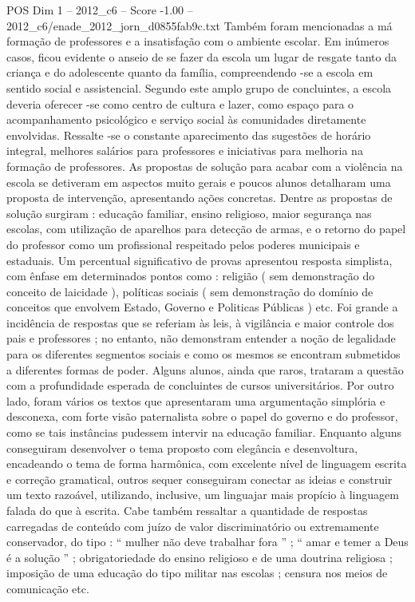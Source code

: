 \begin{textsample}{POS Dim 1 – 2012\_c6 – Score -1.00 – 2012\_c6/enade\_2012\_jorn\_d0855fab9c.txt}
Também foram mencionadas a má formação de professores e a insatisfação com o ambiente escolar.
Em inúmeros casos, ficou evidente o anseio de se fazer da escola um lugar de resgate tanto da criança e do adolescente quanto da família, compreendendo -se a escola em sentido social e assistencial.
Segundo este amplo grupo de concluintes, a escola deveria oferecer -se como centro de cultura e lazer, como espaço para o acompanhamento psicológico e serviço social às comunidades diretamente envolvidas.
Ressalte -se o constante aparecimento das sugestões de horário integral, melhores salários para professores e iniciativas para melhoria na formação de professores.
As propostas de solução para acabar com a violência na escola se detiveram em aspectos muito gerais e poucos alunos detalharam uma proposta de intervenção, apresentando ações concretas.
Dentre as propostas de solução surgiram : educação familiar, ensino religioso, maior segurança nas escolas, com utilização de aparelhos para detecção de armas, e o retorno do papel do professor como um profissional respeitado pelos poderes municipais e estaduais.
Um percentual significativo de provas apresentou resposta simplista, com ênfase em determinados pontos como : religião ( sem demonstração do conceito de laicidade ), políticas sociais ( sem demonstração do domínio de conceitos que envolvem Estado, Governo e Politicas Públicas ) etc.
Foi grande a incidência de respostas que se referiam às leis, à vigilância e maior controle dos pais e professores ; no entanto, não demonstram entender a noção de legalidade para os diferentes segmentos sociais e como os mesmos se encontram submetidos a diferentes formas de poder.
Alguns alunos, ainda que raros, trataram a questão com a profundidade esperada de concluintes de cursos universitários.
Por outro lado, foram vários os textos que apresentaram uma argumentação simplória e desconexa, com forte visão paternalista sobre o papel do governo e do professor, como se tais instâncias pudessem intervir na educação familiar.
Enquanto alguns conseguiram desenvolver o tema proposto com elegância e desenvoltura, encadeando o tema de forma harmônica, com excelente nível de linguagem escrita e correção gramatical, outros sequer conseguiram conectar as ideias e construir um texto razoável, utilizando, inclusive, um linguajar mais propício à linguagem falada do que à escrita.
Cabe também ressaltar a quantidade de respostas carregadas de conteúdo com juízo de valor discriminatório ou extremamente conservador, do tipo : “ mulher não deve trabalhar fora ” ; “ amar e temer a Deus é a solução ” ; obrigatoriedade do ensino religioso e de uma doutrina religiosa ; imposição de uma educação do tipo militar nas escolas ; censura nos meios de comunicação etc.

\end{textsample}
